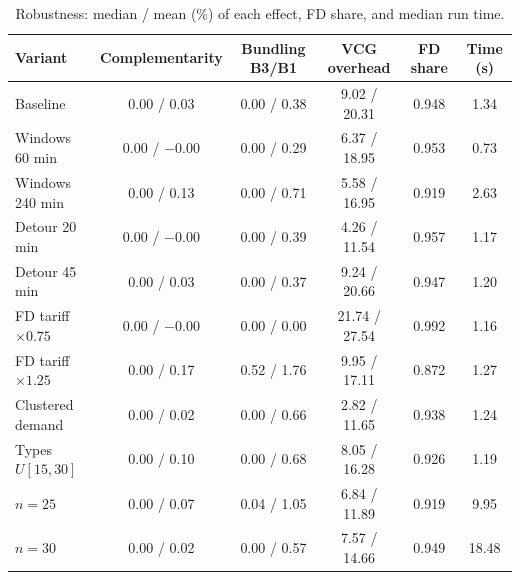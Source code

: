\documentclass[review,12pt]{elsarticle}
\theoremstyle{definition}
\theoremstyle{remark}
\begin{document}
\begin{table}[h]
\centering
\caption{Robustness: median / mean (\%) of each effect, FD share, and median run time.}
\label{tab:rq5}
\footnotesize
\setlength{\tabcolsep}{4pt}
\begin{tabular}{lccccc}
\toprule
Variant & Complementarity & Bundling B3/B1 & VCG overhead & FD share & Time (s)\\
\midrule
Baseline & 0.00 / 0.03 & 0.00 / 0.38 & 9.02 / 20.31 & 0.948 & 1.34\\
Windows 60 min & 0.00 / $-$0.00 & 0.00 / 0.29 & 6.37 / 18.95 & 0.953 & 0.73\\
Windows 240 min & 0.00 / 0.13 & 0.00 / 0.71 & 5.58 / 16.95 & 0.919 & 2.63\\
Detour 20 min & 0.00 / $-$0.00 & 0.00 / 0.39 & 4.26 / 11.54 & 0.957 & 1.17\\
Detour 45 min & 0.00 / 0.03 & 0.00 / 0.37 & 9.24 / 20.66 & 0.947 & 1.20\\
FD tariff $\times0.75$ & 0.00 / $-$0.00 & 0.00 / 0.00 & 21.74 / 27.54 & 0.992 & 1.16\\
FD tariff $\times1.25$ & 0.00 / 0.17 & 0.52 / 1.76 & 9.95 / 17.11 & 0.872 & 1.27\\
Clustered demand & 0.00 / 0.02 & 0.00 / 0.66 & 2.82 / 11.65 & 0.938 & 1.24\\
Types $U[15,30]$ & 0.00 / 0.10 & 0.00 / 0.68 & 8.05 / 16.28 & 0.926 & 1.19\\
$n=25$ & 0.00 / 0.07 & 0.04 / 1.05 & 6.84 / 11.89 & 0.919 & 9.95\\
$n=30$ & 0.00 / 0.02 & 0.00 / 0.57 & 7.57 / 14.66 & 0.949 & 18.48\\
\bottomrule
\end{tabular}
\end{table}
\end{document}
